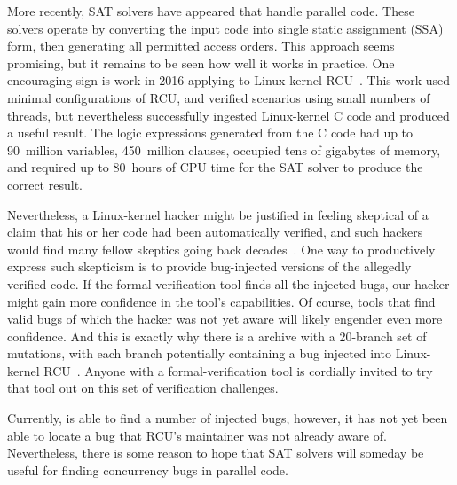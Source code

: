 \fi

More recently, SAT solvers have appeared that handle parallel code.
These solvers operate by converting the input code into single static
assignment (SSA) form, then generating all permitted access orders.
This approach seems promising, but it remains to be seen how well
it works in practice.
One encouraging sign is work in 2016 applying  to Linux-kernel
RCU~\cite{LihaoLiang2016VerifyTreeRCU,Liang:2018:VTB,LanceRoy2017CBMC-SRCU}.
This work used minimal configurations of RCU, and verified scenarios
using small numbers of threads, but nevertheless successfully ingested
Linux-kernel C code and produced a useful result.
The logic expressions generated from the C code had up to 90~million
variables, 450~million clauses, occupied tens of gigabytes of memory,
and required up to 80~hours of CPU time for the SAT solver to produce
the correct result.

Nevertheless, a Linux-kernel hacker might be justified in feeling skeptical
of a claim that his or her code had been automatically verified, and
such hackers would find many fellow skeptics going back
decades~\cite{DeMillo:1979:SPP:359104.359106}.
One way to productively express such skepticism is to provide bug-injected
versions of the allegedly verified code.
If the formal-verification tool finds all the injected bugs, our hacker
might gain more confidence in the tool's capabilities.
Of course, tools that find valid bugs of which the hacker was not yet aware
will likely engender even more confidence.
And this is exactly why there is a  archive with a 20-branch set
of mutations, with each branch potentially containing a bug injected
into Linux-kernel RCU~\cite{PaulEMcKenney2017VerificationChallenge6}.
Anyone with a formal-verification tool is cordially invited to try that
tool out on this set of verification challenges.

Currently,  is able to find a number of injected bugs,
however, it has not yet been able to locate a bug that RCU's
maintainer was not already aware of.
Nevertheless, there is some reason to hope that SAT solvers will someday
be useful for finding concurrency bugs in parallel code.
